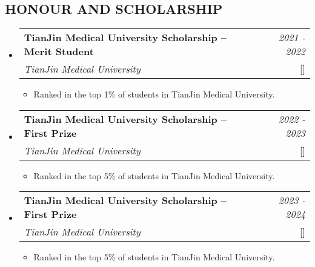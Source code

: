 \documentclass[a4paper,11pt]{article}
\makeatletter
\newcommand{\resumeProject}[4]{
\vspace{0.5mm}\item
    \begin{tabular*}{0.98\textwidth}[t]{l@{\extracolsep{\fill}}r}
        \textbf{#1} & \textit{\footnotesize{#3}} \\
        \footnotesize{\textit{#2}} & \footnotesize{#4}
    \end{tabular*}
    \vspace{-2.4mm}
}
\newcommand{\resumeSubHeadingListStart}{\begin{itemize}[leftmargin=*,labelsep=1mm]}
\newcommand{\resumeItemListStart}{\begin{itemize}[leftmargin=*,labelsep=1mm,itemsep=0.5mm]}
\newcommand{\resumeSubHeadingListEnd}{\end{itemize}\vspace{2mm}}
\newcommand{\resumeItemListEnd}{\end{itemize}\vspace{-2mm}}
\makeatother
\begin{document}
\begin{justify}
\section{\large{\textbf{HONOUR AND SCHOLARSHIP}}}
\vspace{-0.4mm}
\resumeSubHeadingListStart

\resumeProject
  {TianJin Medical University Scholarship -- Merit Student}
  {TianJin Medical University}
  {2021 - 2022}
  {{}[\href{https://github.com/wunaiwuhuang/materials/tree/main/Award\_and\_honour\%E8\%8E\%B7\%E5\%A5\%96\%E8\%AF\%81\%E6\%98\%8E/scholarship}{\textcolor{darkblue}{\faIcon{globe}}}]}
\resumeItemListStart
  \item Ranked in the top 1\% of students in TianJin Medical University.
\resumeItemListEnd

\resumeProject
  {TianJin Medical University Scholarship -- First Prize}
  {TianJin Medical University}
  {2022 - 2023}
  {{}[\href{https://github.com/wunaiwuhuang/materials/tree/main/Award\_and\_honour\%E8\%8E\%B7\%E5\%A5\%96\%E8\%AF\%81\%E6\%98\%8E/scholarship}{\textcolor{darkblue}{\faIcon{globe}}}]}
\resumeItemListStart
  \item Ranked in the top 5\% of students in TianJin Medical University.
\resumeItemListEnd

\resumeProject
  {TianJin Medical University Scholarship -- First Prize}
  {TianJin Medical University}
  {2023 - 2024}
  {{}[\href{https://github.com/wunaiwuhuang/materials/tree/main/Award\_and\_honour\%E8\%8E\%B7\%E5\%A5\%96\%E8\%AF\%81\%E6\%98\%8E/scholarship}{\textcolor{darkblue}{\faIcon{globe}}}]}
\resumeItemListStart
  \item Ranked in the top 5\% of students in TianJin Medical University.
\resumeItemListEnd

\resumeSubHeadingListEnd

\vspace{-6mm}

\end{justify}
\end{document}
